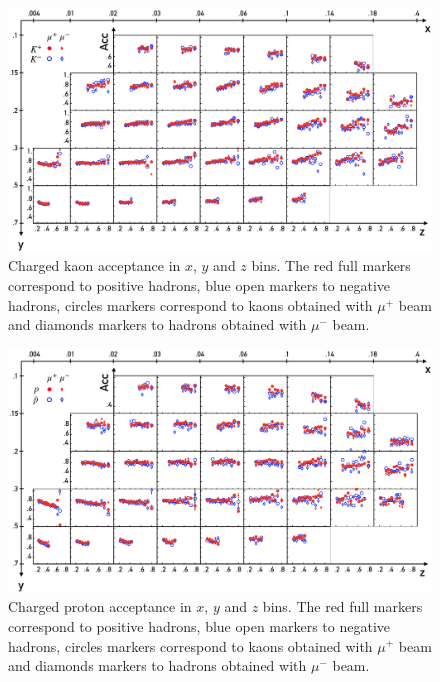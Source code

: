 \begin{figure}
  \centering
	\includegraphics[scale=0.7]{./gfx/AccK.png}
	\caption{Charged kaon acceptance in $x$, $y$ and $z$ bins. The red full markers correspond to positive hadrons, blue open markers to negative hadrons, circles markers correspond to kaons obtained with $\mu^+$ beam and diamonds markers to hadrons obtained with $\mu^-$ beam.}
	\label{pic:AccK}
\end{figure}

\begin{figure}
  \centering
	\includegraphics[scale=0.7]{./gfx/AccP.png}
	\caption{Charged proton acceptance in $x$, $y$ and $z$ bins. The red full markers correspond to positive hadrons, blue open markers to negative hadrons, circles markers correspond to kaons obtained with $\mu^+$ beam and diamonds markers to hadrons obtained with $\mu^-$ beam.}
	\label{pic:AccP}
\end{figure}

